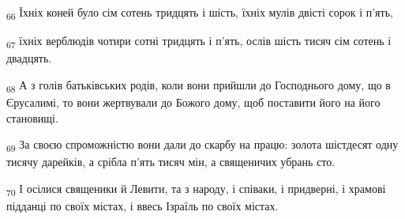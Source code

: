 \begin{tcolorbox}
\textsubscript{66} Їхніх коней було сім сотень тридцять і шість, їхніх мулів двісті сорок і п'ять,
\end{tcolorbox}
\begin{tcolorbox}
\textsubscript{67} їхніх верблюдів чотири сотні тридцять і п'ять, ослів шість тисяч сім сотень і двадцять.
\end{tcolorbox}
\begin{tcolorbox}
\textsubscript{68} А з голів батьківських родів, коли вони прийшли до Господнього дому, що в Єрусалимі, то вони жертвували до Божого дому, щоб поставити його на його становищі.
\end{tcolorbox}
\begin{tcolorbox}
\textsubscript{69} За своєю спроможністю вони дали до скарбу на працю: золота шістдесят одну тисячу дарейків, а срібла п'ять тисяч мін, а священичих убрань сто.
\end{tcolorbox}
\begin{tcolorbox}
\textsubscript{70} І осілися священики й Левити, та з народу, і співаки, і придверні, і храмові підданці по своїх містах, і ввесь Ізраїль по своїх містах.
\end{tcolorbox}
